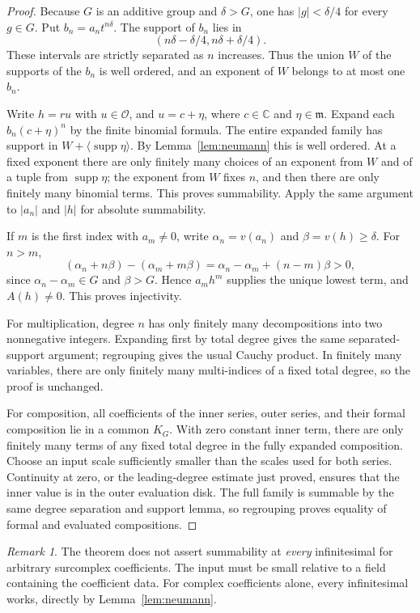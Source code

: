 \documentclass[11pt,a4paper]{article}
\numberwithin{equation}{section}
\theoremstyle{definition}
\theoremstyle{remark}
\newtheorem{remark}[theorem]{Remark}
\newcommand{\C}{\mathbb C}
\newcommand{\OO}{\mathcal O}
\newcommand{\mm}{\mathfrak m}
\newcommand{\supp}{\operatorname{supp}}
\begin{document}
\begin{proof}
Because $G$ is an additive group and $\delta>G$, one has $|g|<\delta/4$ for every $g\in G$. Put $b_n=a_nt^{n\delta}$. The support of $b_n$ lies in
\[
 (n\delta-\delta/4,n\delta+\delta/4).
\]
These intervals are strictly separated as $n$ increases. Thus the union $W$ of the supports of the $b_n$ is well ordered, and an exponent of $W$ belongs to at most one $b_n$.

Write $h=ru$ with $u\in\OO$, and $u=c+\eta$, where $c\in\C$ and $\eta\in\mm$. Expand each $b_n(c+\eta)^n$ by the finite binomial formula. The entire expanded family has support in
$W+\langle\supp\eta\rangle$. By Lemma~\ref{lem:neumann} this is well ordered. At a fixed exponent there are only finitely many choices of an exponent from $W$ and of a tuple from $\supp\eta$; the exponent from $W$ fixes $n$, and then there are only finitely many binomial terms. This proves summability. Apply the same argument to $|a_n|$ and $|h|$ for absolute summability.

If $m$ is the first index with $a_m\ne0$, write $\alpha_n=v(a_n)$ and $\beta=v(h)\geq\delta$. For $n>m$,
\[
 (\alpha_n+n\beta)-(\alpha_m+m\beta)
 =\alpha_n-\alpha_m+(n-m)\beta>0,
\]
since $\alpha_n-\alpha_m\in G$ and $\beta>G$. Hence $a_mh^m$ supplies the unique lowest term, and $A(h)\ne0$. This proves injectivity.

For multiplication, degree $n$ has only finitely many decompositions into two nonnegative integers. Expanding first by total degree gives the same separated-support argument; regrouping gives the usual Cauchy product. In finitely many variables, there are only finitely many multi-indices of a fixed total degree, so the proof is unchanged.

For composition, all coefficients of the inner series, outer series, and their formal composition lie in a common $K_G$. With zero constant inner term, there are only finitely many terms of any fixed total degree in the fully expanded composition. Choose an input scale sufficiently smaller than the scales used for both series. Continuity at zero, or the leading-degree estimate just proved, ensures that the inner value is in the outer evaluation disk. The full family is summable by the same degree separation and support lemma, so regrouping proves equality of formal and evaluated compositions.
\end{proof}

\begin{remark}
The theorem does not assert summability at \emph{every} infinitesimal for arbitrary surcomplex coefficients. The input must be small relative to a field containing the coefficient data. For complex coefficients alone, every infinitesimal works, directly by Lemma~\ref{lem:neumann}.
\end{remark}
\end{document}
